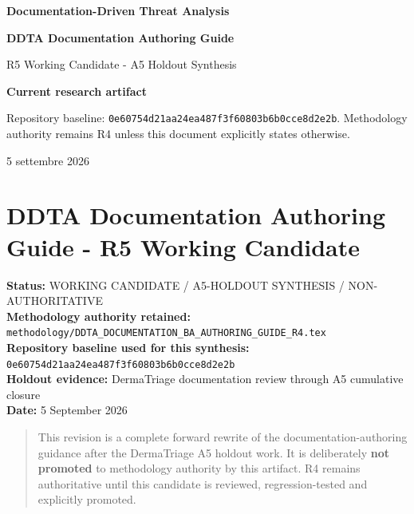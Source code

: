 \documentclass[11pt,a4paper]{article}
\begin{document}
\begin{titlepage}
\thispagestyle{empty}
\vspace*{10mm}
{\sffamily\bfseries\color{DDTANavy}\fontsize{15}{18}\selectfont Documentation-Driven Threat Analysis}\par
\vspace{5mm}
{\sffamily\bfseries\color{DDTANavy}\fontsize{27}{31}\selectfont DDTA Documentation Authoring Guide}\par
\vspace{2mm}
{\sffamily\color{DDTABlue}\fontsize{17}{21}\selectfont R5 Working Candidate - A5 Holdout Synthesis}\par
\vspace{10mm}
\begin{tcolorbox}[enhanced,arc=3pt,boxrule=0pt,colback=DDTANavy,left=12pt,right=12pt,top=10pt,bottom=10pt]
{\color{white}\sffamily\bfseries Current research artifact}\par
{\color{white!88}\small Repository baseline: \texttt{0e60754d21aa24ea487f3f60803b6b0cce8d2e2b}. Methodology authority remains R4 unless this document explicitly states otherwise.}
\end{tcolorbox}
\vfill
{\sffamily\small\color{DDTAGray} 5 settembre 2026}
\end{titlepage}
\tableofcontents
\clearpage
\section{DDTA Documentation Authoring Guide - R5 Working
Candidate}\label{ddta-documentation-authoring-guide---r5-working-candidate}

\textbf{Status:} WORKING CANDIDATE / A5-HOLDOUT SYNTHESIS /
NON-AUTHORITATIVE\\
\textbf{Methodology authority retained:}
\texttt{methodology/DDTA\_DOCUMENTATION\_BA\_AUTHORING\_GUIDE\_R4.tex}\\
\textbf{Repository baseline used for this synthesis:}
\texttt{0e60754d21aa24ea487f3f60803b6b0cce8d2e2b}\\
\textbf{Holdout evidence:} DermaTriage documentation review through A5
cumulative closure\\
\textbf{Date:} 5 September 2026

\begin{quote}
This revision is a complete forward rewrite of the
documentation-authoring guidance after the DermaTriage A5 holdout work.
It is deliberately \textbf{not promoted} to methodology authority by
this artifact. R4 remains authoritative until this candidate is
reviewed, regression-tested and explicitly promoted.
\end{quote}
\end{document}
